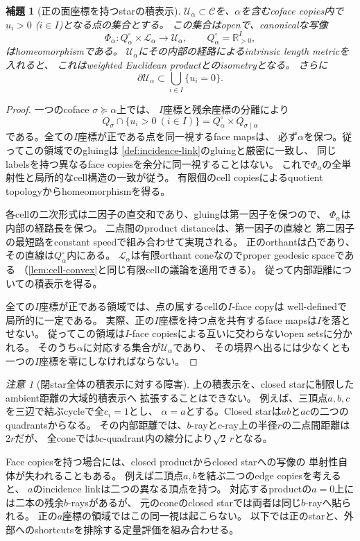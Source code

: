 \documentclass[11pt,a4paper]{ltjsarticle}
\newcommand{\RR}{\mathbb R}
\newcommand{\cC}{\mathcal C}
\theoremstyle{plain}
\newtheorem{lemma}[lemma]{補題}
\theoremstyle{definition}
\theoremstyle{remark}
\newtheorem{remark}[remark]{注意}
\begin{document}
\begin{lemma}[正の面座標を持つstarの積表示]
\label{lem:positive-star-product}
$\mathcal U_\alpha\subset\cC$を、$\alpha$を含むcoface copies内で
$u_i>0$ ($i\in I$)となる点の集合とする。
この集合はopenで、canonicalな写像
\[
 \Phi_\alpha:
 Q_\alpha^\circ\times\mathcal L_\alpha
 \longrightarrow\mathcal U_\alpha,
 \qquad Q_\alpha^\circ=\RR_{>0}^{I},
\]
はhomeomorphismである。
$\mathcal U_\alpha$にその内部の経路によるintrinsic length metricを入れると、
これはweighted Euclidean productとのisometryとなる。
さらに
\[
 \partial\mathcal U_\alpha
 \subset\bigcup_{i\in I}\{u_i=0\}.
\]
\end{lemma}
\begin{proof}
一つのcoface $\sigma\succeq\alpha$上では、
$I$座標と残余座標の分離により
\[
 Q_\sigma\cap\{u_i>0\ (i\in I)\}
 =Q_\alpha^\circ\times Q_{\sigma\mid\alpha}
\]
である。全ての$I$座標が正である点を同一視するface mapsは、
必ず$\alpha$を保つ。従ってこの領域でのgluingは
\cref{def:incidence-link}のgluingと厳密に一致し、
同じlabelsを持つ異なるface copiesを余分に同一視することはない。
これで$\Phi_\alpha$の全単射性と局所的なcell構造の一致が従う。
有限個のcell copiesによるquotient topologyからhomeomorphismを得る。

各cellの二次形式は二因子の直交和であり、gluingは第一因子を保つので、
$\Phi_\alpha$は内部の経路長を保つ。
二点間のproduct distanceは、第一因子の直線と
第二因子の最短路をconstant speedで組み合わせて実現される。
正のorthantは凸であり、その直線は$Q_\alpha^\circ$内にある。
$\mathcal L_\alpha$は有限orthant coneなのでproper geodesic spaceである
（\cref{lem:cell-convex}と同じ有限cellの議論を適用できる）。
従って内部距離についての積表示を得る。

全ての$I$座標が正である領域では、点の属するcellの$I$-face copyは
well-definedで局所的に一定である。
実際、正の$I$座標を持つ点を共有するface mapsは$I$を落とせない。
従ってこの領域は$I$-face copiesによる互いに交わらないopen setsに分かれる。
そのうち$\alpha$に対応する集合が$\mathcal U_\alpha$であり、
その境界へ出るには少なくとも一つの$I$座標を零にしなければならない。
\end{proof}

\begin{remark}[閉star全体の積表示に対する障害]
\label{rem:closed-star-obstruction}
上の積表示を、closed starに制限したambient距離の大域的積表示へ
拡張することはできない。
例えば、三頂点$a,b,c$を三辺で結ぶcycleで全$c_i=1$とし、
$\alpha=a$とする。Closed starは$ab$と$ac$の二つのquadrantsからなる。
その内部距離では、$b$-rayと$c$-ray上の半径$r$の二点間距離は$2r$だが、
全coneでは$bc$-quadrant内の線分により$\sqrt2\,r$となる。

Face copiesを持つ場合には、closed productからclosed starへの写像の
単射性自体が失われることもある。
例えば二頂点$a,b$を結ぶ二つのedge copiesを考えると、
$a$のincidence linkは二つの異なる頂点を持つ。
対応するproductの$a=0$上には二本の残余$b$-raysがあるが、
元のconeのclosed starでは両者は同じ$b$-rayへ貼られる。
正の$a$座標の領域ではこの同一視は起こらない。
以下では正のstarと、外部へのshortcutsを排除する定量評価を組み合わせる。
\end{remark}
\end{document}
